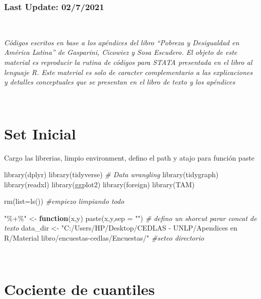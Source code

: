 \documentclass[
]{book}
\newenvironment{Shaded}{\begin{snugshade}}{\end{snugshade}}
\newcommand{\AttributeTok}[1]{\textcolor[rgb]{0.77,0.63,0.00}{#1}}
\newcommand{\CommentTok}[1]{\textcolor[rgb]{0.56,0.35,0.01}{\textit{#1}}}
\newcommand{\ControlFlowTok}[1]{\textcolor[rgb]{0.13,0.29,0.53}{\textbf{#1}}}
\newcommand{\FunctionTok}[1]{\textcolor[rgb]{0.00,0.00,0.00}{#1}}
\newcommand{\NormalTok}[1]{#1}
\newcommand{\OtherTok}[1]{\textcolor[rgb]{0.56,0.35,0.01}{#1}}
\newcommand{\StringTok}[1]{\textcolor[rgb]{0.31,0.60,0.02}{#1}}
\begin{document}
\hypertarget{last-update-0272021}{%
\subsubsection*{Last Update: 02/7/2021}\label{last-update-0272021}}

~

\emph{Códigos escritos en base a los apéndices del libro ``Pobreza y Desigualdad en América Latina'' de Gasparini, Cicowiez y Sosa Escudero. El objeto de este material es reproducir la rutina de códigos para STATA presentada en el libro al lenguaje R. Este material es solo de caracter complementario a las explicaciones y detalles conceptuales que se presentan en el libro de texto y los apéndices}

~

\hypertarget{set-inicial}{%
\section{Set Inicial}\label{set-inicial}}

Cargo las librerias, limpio environment, defino el path y atajo para función paste

\begin{Shaded}
\begin{Highlighting}[]
\FunctionTok{library}\NormalTok{(dplyr)}
\FunctionTok{library}\NormalTok{(tidyverse) }\CommentTok{\# Data wrangling}
\FunctionTok{library}\NormalTok{(tidygraph)}
\FunctionTok{library}\NormalTok{(readxl)}
\FunctionTok{library}\NormalTok{(ggplot2)}
\FunctionTok{library}\NormalTok{(foreign)}
\FunctionTok{library}\NormalTok{(TAM)}

\FunctionTok{rm}\NormalTok{(}\AttributeTok{list=}\FunctionTok{ls}\NormalTok{())    }\CommentTok{\#empiezo limpiando todo }

\StringTok{"\%+\%"} \OtherTok{\textless{}{-}} \ControlFlowTok{function}\NormalTok{(x,y) }\FunctionTok{paste}\NormalTok{(x,y,}\AttributeTok{sep =} \StringTok{""}\NormalTok{)      }\CommentTok{\# defino un shorcut parar concat de texto}
\NormalTok{data\_dir }\OtherTok{\textless{}{-}} \StringTok{"C:/Users/HP/Desktop/CEDLAS {-} UNLP/Apendices en R/Material libro/encuestas{-}cedlas/Encuestas/"}  \CommentTok{\#seteo directorio }
\end{Highlighting}
\end{Shaded}

~

\hypertarget{cociente-de-cuantiles}{%
\section{Cociente de cuantiles}\label{cociente-de-cuantiles}}
\end{document}
